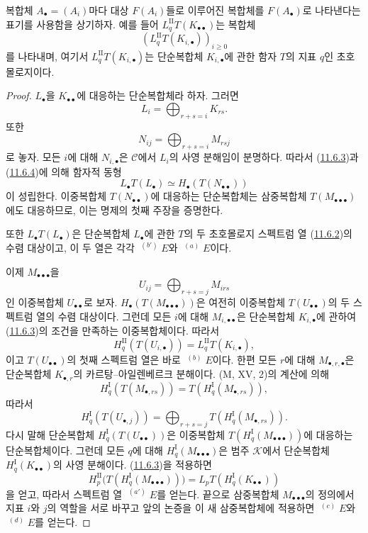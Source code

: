 복합체 $A_\bullet=(A_i)$마다 대상 $F(A_i)$들로 이루어진 복합체를
$F(A_\bullet)$로 나타낸다는 표기를 사용함을 상기하자. 예를 들어
$L_q^{\mathrm{II}}T(K_{\bullet\bullet})$는 복합체
\[
(L_q^{\mathrm{II}}T(K_{i,\bullet}))_{i\geq0}
\]
를 나타내며, 여기서 $L_q^{\mathrm{II}}T(K_{i,\bullet})$는
단순복합체 $K_{i,\bullet}$에 관한 함자 $T$의 지표 $q$인
초호몰로지이다.

\begin{proof}
$L_\bullet$을 $K_{\bullet\bullet}$에 대응하는 단순복합체라 하자.
그러면
\[
L_i=\bigoplus_{r+s=i}K_{rs}.
\]
또한
\[
N_{ij}=\bigoplus_{r+s=i}M_{rsj}
\]
로 놓자. 모든 $i$에 대해 $N_{i,\bullet}$은 $\mathcal C$에서
$L_i$의 사영 분해임이 분명하다. 따라서
(\hyperref[0.11.6.3-fr]{11.6.3})과
(\hyperref[0.11.6.4-fr]{11.6.4})에 의해 함자적 동형
\[
L_\bullet T(L_\bullet)\simeq H_\bullet(T(N_{\bullet\bullet}))
\]
이 성립한다. 이중복합체 $T(N_{\bullet\bullet})$에 대응하는
단순복합체는 삼중복합체 $T(M_{\bullet\bullet\bullet})$에도
대응하므로, 이는 명제의 첫째 주장을 증명한다.

또한 $L_\bullet T(L_\bullet)$은 단순복합체 $L_\bullet$에 관한
$T$의 두 초호몰로지 스펙트럼 열
(\hyperref[0.11.6.2-fr]{11.6.2})의 수렴 대상이고, 이 두 열은 각각
$\mathop{}^{(b')}E$와 $\mathop{}^{(a)}E$이다.

이제 $M_{\bullet\bullet\bullet}$을
\[
U_{ij}=\bigoplus_{r+s=j}M_{irs}
\]
인 이중복합체 $U_{\bullet\bullet}$로 보자.
$H_\bullet(T(M_{\bullet\bullet\bullet}))$은 여전히 이중복합체
$T(U_{\bullet\bullet})$의 두 스펙트럼 열의 수렴 대상이다. 그런데
모든 $i$에 대해 $M_{i,\bullet\bullet}$은 단순복합체
$K_{i,\bullet}$에 관하여
(\hyperref[0.11.6.3-fr]{11.6.3})의 조건을 만족하는 이중복합체이다.
따라서
\[
H_q^{\mathrm{II}}(T(U_{i,\bullet}))
=L_q^{\mathrm{II}}T(K_{i,\bullet}),
\]
이고 $T(U_{\bullet\bullet})$의 첫째 스펙트럼 열은 바로
$\mathop{}^{(b)}E$이다. 한편 모든 $r$에 대해
$M_{\bullet,r,\bullet}$은 단순복합체 $K_{\bullet,r}$의
카르탕--아일렌베르크 분해이다. (M, XV, 2)의 계산에 의해
\[
H_q^{\mathrm I}(T(M_{\bullet,rs}))
=T(H_q^{\mathrm I}(M_{\bullet,rs})),
\]
따라서
\[
H_q^{\mathrm I}(T(U_{\bullet,j}))
=\bigoplus_{r+s=j}T(H_q^{\mathrm I}(M_{\bullet,rs})).
\]
다시 말해 단순복합체
$H_q^{\mathrm I}(T(U_{\bullet\bullet}))$은 이중복합체
$T(H_q^{\mathrm I}(M_{\bullet\bullet\bullet}))$에 대응하는
단순복합체이다. 그런데 모든 $q$에 대해
$H_q^{\mathrm I}(M_{\bullet\bullet\bullet})$은 범주 $\mathcal K$에서
단순복합체 $H_q^{\mathrm I}(K_{\bullet\bullet})$의 사영 분해이다.
(\hyperref[0.11.6.3-fr]{11.6.3})을 적용하면
\[
H_p^{\mathrm{II}}
\bigl(T(H_q^{\mathrm I}(M_{\bullet\bullet\bullet}))\bigr)
=L_pT(H_q^{\mathrm I}(K_{\bullet\bullet}))
\]
을 얻고, 따라서 스펙트럼 열 $\mathop{}^{(a')}E$를 얻는다. 끝으로
삼중복합체 $M_{\bullet\bullet\bullet}$의 정의에서 지표 $i$와 $j$의
역할을 서로 바꾸고 앞의 논증을 이 새 삼중복합체에 적용하면
$\mathop{}^{(c)}E$와 $\mathop{}^{(d)}E$를 얻는다.
\end{proof}

